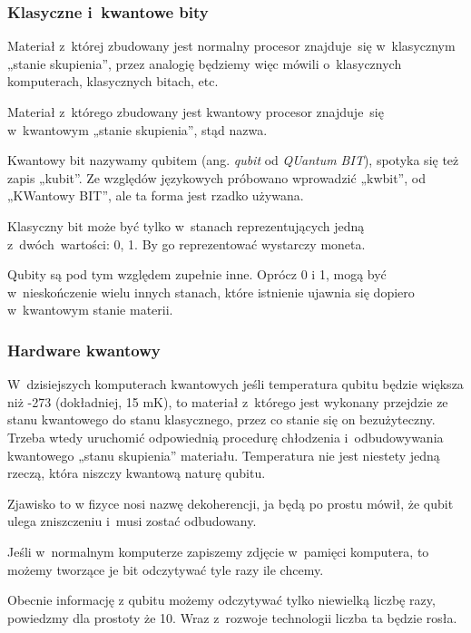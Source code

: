 \documentclass[10pt,t]{beamer}
\begin{document}
\begin{frame}
  \frametitle{Klasyczne i~kwantowe bity}


  Materiał z~której zbudowany jest normalny procesor znajduje~się
  w~klasycznym „stanie skupienia”, przez analogię będziemy więc
  mówili o~klasycznych komputerach, klasycznych bitach, etc.

  Materiał z~którego zbudowany jest kwantowy procesor znajduje~się
  w~kwantowym „stanie skupienia”, stąd nazwa.

  Kwantowy bit nazywamy \alert{qubitem} (ang. \emph{qubit} od
  \emph{QUantum BIT}), spotyka się też zapis „kubit”. Ze względów
  językowych próbowano wprowadzić „kwbit”, od „KWantowy BIT”, ale
  ta forma jest rzadko używana.

  Klasyczny bit może być tylko w~stanach reprezentujących jedną
  z~dwóch~wartości: 0, 1. By go reprezentować wystarczy moneta.

  Qubity są pod tym względem zupełnie inne. Oprócz 0 i 1, mogą być
  w~nieskończenie wielu innych stanach, które istnienie ujawnia się
  dopiero w~kwantowym stanie materii.

\end{frame}





\begin{frame}
  \frametitle{Hardware kwantowy}


  W~dzisiejszych komputerach kwantowych jeśli temperatura qubitu
  będzie większa niż -273\textcelsius{ } (dokładniej, 15 mK), to
  materiał z~którego jest wykonany przejdzie ze stanu kwantowego do
  stanu klasycznego, przez co stanie się on bezużyteczny. Trzeba wtedy
  uruchomić odpowiednią procedurę chłodzenia i~odbudowywania
  kwantowego „stanu skupienia” materiału. Temperatura nie jest
  niestety jedną rzeczą, która niszczy kwantową naturę qubitu.

  Zjawisko to w fizyce nosi nazwę dekoherencji, ja będą po prostu
  mówił, że qubit ulega zniszczeniu i~musi zostać odbudowany.

  Jeśli w~normalnym komputerze zapiszemy zdjęcie w~pamięci komputera,
  to możemy tworzące je bit odczytywać tyle razy ile chcemy.

  Obecnie informację z qubitu możemy odczytywać tylko niewielką liczbę
  razy, powiedzmy dla prostoty że 10. Wraz z~rozwoje technologii
  liczba ta będzie rosła.

\end{frame}
\end{document}

